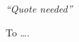 \begin{dedication} 
\epigraph{\textit{``Quote needed''}}{}
\vspace{30mm}
To \dots.
\end{dedication}

